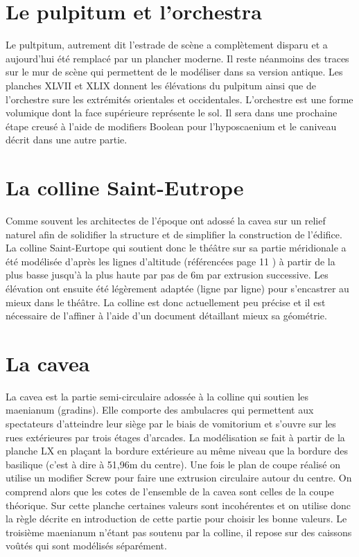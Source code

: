 		\section{Le pulpitum et l'orchestra} 

Le pultpitum, autrement dit l'estrade de scène a complètement disparu et a aujourd'hui été remplacé par un plancher moderne. Il reste néanmoins des traces sur le mur de scène qui permettent de le modéliser dans sa version antique. Les planches XLVII et XLIX \cite{orangePl} donnent les élévations du pulpitum ainsi que de l'orchestre sure les extrémités orientales et occidentales. L'orchestre est une forme volumique dont la face supérieure représente le sol. Il sera dans une prochaine étape creusé à l'aide de modifiers Boolean pour l'hyposcaenium et le caniveau décrit dans une autre partie.

		\section{La colline Saint-Eutrope} 
Comme souvent les architectes de l'époque ont adossé la cavea sur un relief naturel afin de solidifier la structure et de simplifier la construction de l'édifice. La colline Saint-Eurtope qui soutient donc le théâtre sur sa partie méridionale a été modélisée d'après les lignes d'altitude (référencées page 11 \cite{orangeTxt}) à partir de la plus basse jusqu'à la plus haute par pas de 6m par extrusion successive. Les élévation ont ensuite été légèrement adaptée (ligne par ligne) pour s'encastrer au mieux dans le théâtre. La colline est donc actuellement peu précise et il est nécessaire de l'affiner à l'aide d'un document détaillant mieux sa géométrie.

		\section{La cavea} 

La cavea est la partie semi-circulaire adossée à la colline qui soutien les maenianum (gradins). Elle comporte des \glspl{ambulacre} qui permettent aux spectateurs d'atteindre leur siège par le biais de vomitorium et s'ouvre sur les rues extérieures par trois étages d'arcades. La modélisation se fait à partir de la planche LX \cite{orangePl} en plaçant la bordure extérieure au même niveau que la bordure des basilique (c'est à dire à 51,96m du centre). Une fois le plan de coupe réalisé on utilise un modifier Screw pour faire une extrusion circulaire autour du centre. On comprend alors que les cotes de l'ensemble de la cavea sont celles de la coupe théorique. Sur cette planche certaines valeurs sont incohérentes et on utilise donc la règle décrite en introduction de cette partie pour choisir les bonne valeurs.
Le troisième maenianum n'étant pas soutenu par la colline, il repose sur des caissons voûtés qui sont modélisés séparément. 

